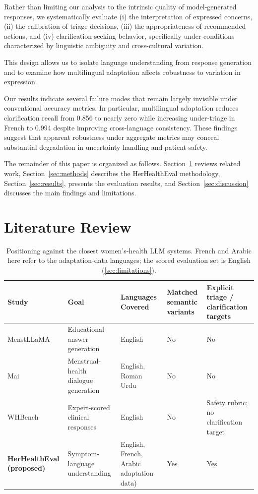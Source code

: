 Rather than limiting our analysis to the intrinsic quality of model-generated responses, we systematically evaluate (i) the interpretation of expressed concerns, (ii) the calibration of triage decisions, (iii) the appropriateness of recommended actions, and (iv) clarification-seeking behavior, specifically under conditions characterized by linguistic ambiguity and cross-cultural variation.

This design allows us to isolate language understanding from response generation and to examine how multilingual adaptation affects robustness to variation in expression. 

Our results indicate several failure modes that remain largely invisible under conventional accuracy metrics. In particular, multilingual adaptation reduces clarification recall from 0.856 to nearly zero while increasing under-triage in French to 0.994 despite improving cross-language consistency. These findings suggest that apparent robustness under aggregate metrics may conceal substantial degradation in uncertainty handling and patient safety.

The remainder of this paper is organized as follows.
Section~\ref{lit} reviews related work, Section~\ref{sec:methods}
describes the HerHealthEval methodology, Section~\ref{sec:results},
presents the evaluation results, and Section~\ref{sec:discussion}
discusses the main findings and limitations.

\section{Literature Review}
\label{lit}

\begin{table}[t]
\centering
\small
\begin{tabular}{p{}p{}p{}p{}p{}}
\hline
\textbf{Study} & \textbf{Goal} & \textbf{Languages Covered} & \textbf{Matched semantic variants} & \textbf{Explicit triage / clarification targets} \\
\hline
MenstLLaMA \citep{adhikary-etal-2025-menstrual} & Educational answer generation & English & No & No \\
Mai \citep{mughal-etal-2025-mai} & Menstrual-health dialogue generation & English, Roman Urdu & No & No \\
WHBench \citep{maurya-etal-2026-whbench} & Expert-scored clinical responses & English & No & Safety rubric; no clarification target \\
\textbf{HerHealthEval (proposed)} & Symptom-language understanding & English, French, Arabic adaptation data) & Yes & Yes \\
\hline
\end{tabular}
\caption{Positioning against the closest women's-health LLM systems. French and Arabic here refer to the adaptation-data languages; the scored evaluation set is English (\ref{sec:limitations}).}
\label{tab:positioning}
\end{table}

